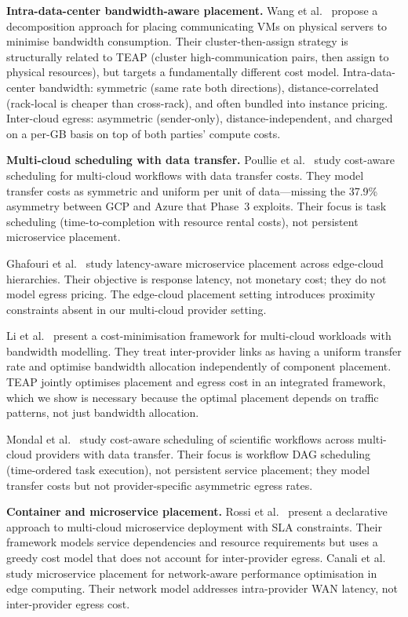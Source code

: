 \documentclass[10pt,journal]{IEEEtran}
\begin{document}
\textbf{Intra-data-center bandwidth-aware placement.}
Wang et al.~\cite{wang2011} propose a decomposition approach for placing
communicating VMs on physical servers to minimise bandwidth consumption.
Their cluster-then-assign strategy is structurally related to TEAP (cluster
high-communication pairs, then assign to physical resources), but targets
a fundamentally different cost model.
Intra-data-center bandwidth: symmetric (same rate both directions),
distance-correlated (rack-local is cheaper than cross-rack), and often bundled
into instance pricing.
Inter-cloud egress: asymmetric (sender-only), distance-independent, and
charged on a per-GB basis on top of both parties' compute costs.

\textbf{Multi-cloud scheduling with data transfer.}
Poullie et al.~\cite{poullie2017} study cost-aware scheduling for multi-cloud
workflows with data transfer costs.
They model transfer costs as symmetric and uniform per unit of data---missing
the 37.9\% asymmetry between GCP and Azure that Phase~3 exploits.
Their focus is task scheduling (time-to-completion with resource rental costs),
not persistent microservice placement.

Ghafouri et al.~\cite{ghafouri2019} study latency-aware microservice placement
across edge-cloud hierarchies.
Their objective is response latency, not monetary cost; they do not model
egress pricing.
The edge-cloud placement setting introduces proximity constraints absent in our
multi-cloud provider setting.

Li et al.~\cite{li2020cloud} present a cost-minimisation framework for multi-cloud
workloads with bandwidth modelling.
They treat inter-provider links as having a uniform transfer rate and optimise
bandwidth allocation independently of component placement.
TEAP jointly optimises placement and egress cost in an integrated framework,
which we show is necessary because the optimal placement depends on traffic
patterns, not just bandwidth allocation.

Mondal et al.~\cite{mondal2020} study cost-aware scheduling of scientific workflows
across multi-cloud providers with data transfer.
Their focus is workflow DAG scheduling (time-ordered task execution), not
persistent service placement; they model transfer costs but not provider-specific
asymmetric egress rates.

\textbf{Container and microservice placement.}
Rossi et al.~\cite{rossi2020} present a declarative approach to multi-cloud
microservice deployment with SLA constraints.
Their framework models service dependencies and resource requirements but uses
a greedy cost model that does not account for inter-provider egress.
Canali et al.~\cite{canali2021} study microservice placement for network-aware
performance optimisation in edge computing.
Their network model addresses intra-provider WAN latency, not inter-provider
egress cost.
\end{document}
